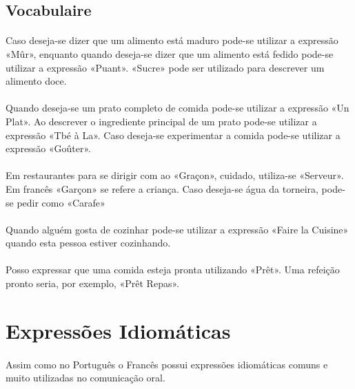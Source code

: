 \documentclass{article}
\begin{document}
    \subsection{Vocabulaire}
        \paragraph{}Caso deseja-se dizer que um alimento está maduro pode-se utilizar a expressão «Mûr», enquanto quando deseja-se dizer que um alimento está fedido pode-se utilizar a expressão «Puant». «Sucre» pode ser utilizado para descrever um alimento doce.
        
        \paragraph{}Quando deseja-se um prato completo de comida pode-se utilizar a expressão «Un Plat». Ao descrever o ingrediente principal de um prato pode-se utilizar a expressão «Tbé à La». Caso deseja-se experimentar a comida pode-se utilizar a expressão «Goûter».        
        
        \paragraph{}Em restaurantes para se dirigir com ao «Graçon», cuidado, utiliza-se «Serveur». Em francês «Garçon» se refere a criança. Caso deseja-se água da torneira, pode-se pedir como «Carafe»
        
        \paragraph{}Quando alguém gosta de cozinhar pode-se utilizar a expressão «Faire la Cuisine» quando esta pessoa estiver cozinhando.

        \paragraph{}Posso expressar que uma comida esteja pronta utilizando «Prêt». Uma refeição pronto seria, por exemplo, «Prêt Repas».
\newpage

\section{Expressões Idiomáticas}
    \paragraph{}Assim como no Português o Francês possui expressões idiomáticas comuns e muito utilizadas no comunicação oral.
            
\end{document}
